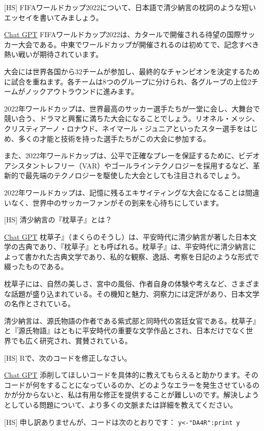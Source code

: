\documentclass[
]{bxjsbook}
\theoremstyle{definition}
\theoremstyle{definition}
\theoremstyle{definition}
\theoremstyle{definition}
\theoremstyle{remark}
\begin{document}
{[}HS{]} FIFAワールドカップ2022について、日本語で清少納言の枕詞のような短いエッセイを書いてみましょう。

\protect\hyperlink{chatgpt}{Chat GPT} FIFAワールドカップ2022は、カタールで開催される待望の国際サッカー大会である。中東でワールドカップが開催されるのは初めてで、記念すべき熱い戦いが期待されています。

大会には世界各国から32チームが参加し、最終的なチャンピオンを決定するために試合を重ねます。各チームは8つのグループに分けられ、各グループの上位2チームがノックアウトラウンドに進みます。

2022年ワールドカップは、世界最高のサッカー選手たちが一堂に会し、大舞台で競い合う、ドラマと興奮に満ちた大会になることでしょう。リオネル・メッシ、クリスティアーノ・ロナウド、ネイマール・ジュニアといったスター選手をはじめ、多くの才能と技術を持った選手たちがこの大会に参加する。

また、2022年ワールドカップは、公平で正確なプレーを保証するために、ビデオアシスタントレフリー（VAR）やゴールラインテクノロジーを採用するなど、革新的で最先端のテクノロジーを駆使した大会としても注目されるでしょう。

2022年ワールドカップは、記憶に残るエキサイティングな大会になることは間違いなく、世界中のサッカーファンがその到来を心待ちにしています。

{[}HS{]} 清少納言の『枕草子』とは？

\protect\hyperlink{chatgpt}{Chat GPT} 枕草子』（まくらのそうし）は、平安時代に清少納言が著した日本文学の古典であり、『枕草子』とも呼ばれる。枕草子』は、平安時代に清少納言によって書かれた古典文学であり、私的な観察、逸話、考察を日記のような形式で綴ったものである。

枕草子には、自然の美しさ、宮中の風俗、作者自身の体験や考えなど、さまざまな話題が盛り込まれている。その機知と魅力、洞察力には定評があり、日本文学の名作とされている。

清少納言は、源氏物語の作者である紫式部と同時代の宮廷女官である。枕草子』と『源氏物語』はともに平安時代の重要な文学作品とされ、日本だけでなく世界でも広く研究され、賞賛されている。

{[}HS{]} Rで、次のコードを修正しなさい。

\protect\hyperlink{chatgpt}{Chat GPT} 添削してほしいコードを具体的に教えてもらえると助かります。そのコードが何をすることになっているのか、どのようなエラーを発生させているのかが分からないと、私は有用な修正を提供することが難しいのです。解決しようとしている問題について、より多くの文脈または詳細を教えてください。

{[}HS{]} 申し訳ありませんが、コードは次のとおりです： \texttt{y\textless{}-"DA4R":print\ y}
\end{document}

